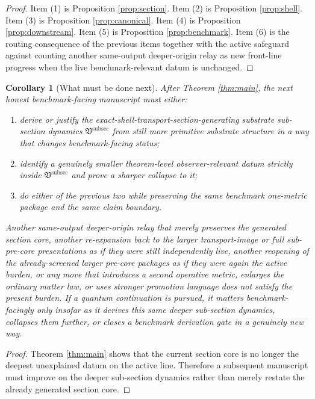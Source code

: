 \documentclass[11pt]{article}
\newcommand{\SubSectionPackage}{\mathfrak V^{\mathrm{subsec}}}
\newtheorem{corollary}{Corollary}
\begin{document}
\begin{proof}
Item (1) is Proposition \ref{prop:section}. Item (2) is Proposition \ref{prop:shell}. Item (3) is Proposition \ref{prop:canonical}. Item (4) is Proposition \ref{prop:downstream}. Item (5) is Proposition \ref{prop:benchmark}. Item (6) is the routing consequence of the previous items together with the active safeguard against counting another same-output deeper-origin relay as new front-line progress when the live benchmark-relevant datum is unchanged.
\end{proof}

\begin{corollary}[What must be done next]
\label{cor:next}
After Theorem \ref{thm:main}, the next honest benchmark-facing manuscript must either:
\begin{enumerate}
    \item derive or justify the exact-shell-transport-section-generating substrate sub-section dynamics \(\SubSectionPackage\) from still more primitive substrate structure in a way that changes benchmark-facing status;
    \item identify a genuinely smaller theorem-level observer-relevant datum strictly inside \(\SubSectionPackage\) and prove a sharper collapse to it;
    \item do either of the previous two while preserving the same benchmark one-metric package and the same claim boundary.
\end{enumerate}
Another same-output deeper-origin relay that merely preserves the generated section core, another re-expansion back to the larger transport-image or full sub-pre-core presentations as if they were still independently live, another reopening of the already-screened larger pre-core packages as if they were again the active burden, or any move that introduces a second operative metric, enlarges the ordinary matter law, or uses stronger promotion language does not satisfy the present burden. If a quantum continuation is pursued, it matters benchmark-facingly only insofar as it derives this same deeper sub-section dynamics, collapses them further, or closes a benchmark derivation gate in a genuinely new way.
\end{corollary}

\begin{proof}
Theorem \ref{thm:main} shows that the current section core is no longer the deepest unexplained datum on the active line. Therefore a subsequent manuscript must improve on the deeper sub-section dynamics rather than merely restate the already generated section core.
\end{proof}
\end{document}
